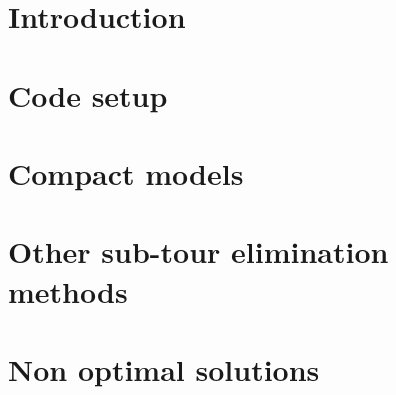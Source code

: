 
\thispagestyle{empty}

%

\tableofcontents %

\clearpage{\pagestyle{plain}\cleardoublepage} %


\chapter{Introduction} %
\label{chapter:primo_capitolo} %

\chapter{Code setup}
\label{chapter:code-setup}


\chapter{Compact models} 
\label{chapter:compact-models} 
 

\clearpage{\pagestyle{plain}\cleardoublepage}
\chapter{Other sub-tour elimination methods} 
\label{chapter:other-sec} 
 

\clearpage{\pagestyle{plain}\cleardoublepage}
\chapter{Non optimal solutions} 
\label{chapter:codice} 
 

\clearpage{\pagestyle{plain}\cleardoublepage}


